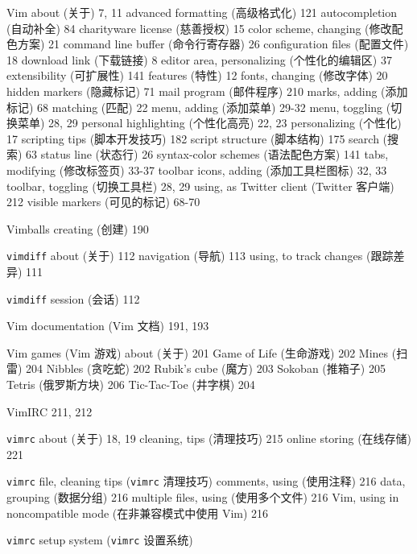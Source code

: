 Vim
  about (关于) 7, 11
  advanced formatting (高级格式化) 121
  autocompletion (自动补全) 84
  charityware license (慈善授权) 15
  color scheme, changing (修改配色方案) 21
  command line buffer (命令行寄存器) 26
  configuration files (配置文件) 18
  download link (下载链接) 8
  editor area, personalizing (个性化的编辑区) 37
  extensibility (可扩展性) 141
  features (特性) 12
  fonts, changing (修改字体) 20
  hidden markers (隐藏标记) 71
  mail program (邮件程序) 210
  marks, adding (添加标记) 68
  matching (匹配) 22
  menu, adding (添加菜单) 29-32
  menu, toggling (切换菜单) 28, 29
  personal highlighting (个性化高亮) 22, 23
  personalizing (个性化) 17
  scripting tips (脚本开发技巧) 182
  script structure (脚本结构) 175
  search (搜索) 63
  status line (状态行) 26
  syntax-color schemes (语法配色方案) 141
  tabs, modifying (修改标签页) 33-37
  toolbar icons, adding (添加工具栏图标) 32, 33
  toolbar, toggling (切换工具栏) 28, 29
  using, as Twitter client (Twitter 客户端) 212
  visible markers (可见的标记) 68-70

Vimballs
  creating (创建) 190

\texttt{vimdiff}
  about (关于) 112
  navigation (导航) 113
  using, to track changes (跟踪差异) 111

\texttt{vimdiff} session (会话) 112

Vim documentation (Vim 文档) 191, 193

Vim games (Vim 游戏)
  about (关于) 201
  Game of Life (生命游戏) 202
  Mines (扫雷) 204
  Nibbles (贪吃蛇) 202
  Rubik's cube (魔方) 203
  Sokoban (推箱子) 205
  Tetris (俄罗斯方块) 206
  Tic-Tac-Toe (井字棋) 204

VimIRC 211, 212

\texttt{vimrc}
  about (关于) 18, 19
  cleaning, tips (清理技巧) 215
  online storing (在线存储) 221

\texttt{vimrc} file, cleaning tips (\texttt{vimrc} 清理技巧)
  comments, using (使用注释) 216
  data, grouping (数据分组) 216
  multiple files, using (使用多个文件) 216
  Vim, using in noncompatible mode (在非兼容模式中使用 Vim) 216

\texttt{vimrc} setup system (\texttt{vimrc} 设置系统)
